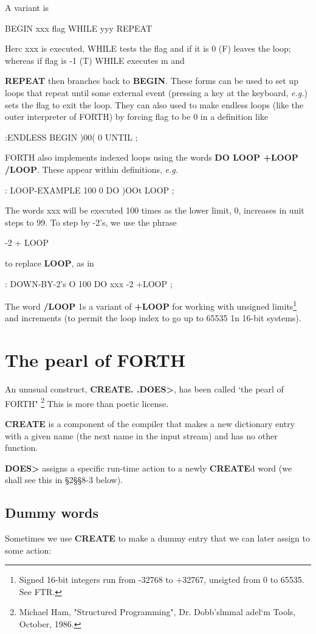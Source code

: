 A variant is

BEGIN xxx ﬂag WHILE yyy REPEAT

Herc xxx is executed, WHILE tests the ﬂag and if it is 0 (F) leaves
the loop; whereas if flag is -1 (T) WHILE executes m and

\textbf{REPEAT} then branches back to \textbf{BEGIN}. These forms can be used to set up loops that repeat until some external event (pressing a key at the keyboard, \textit{\textit{e.g.}}) sets the ﬂag to exit the loop. They can also used to make endless loops (like the outer interpreter of FORTH) by forcing flag to be 0 in a definition like

:ENDLESS BEGIN )00( 0 UNTIL ;

FORTH also implements indexed loops using the words \textbf{DO LOOP +LOOP /LOOP}. These appear within definitions, \textit{\textit{e.g.}}

: LOOP-EXAMPLE 100 0 DO )OOt LOOP ;

The words xxx will be executed 100 times as the lower limit, 0, increases in unit steps to 99. To step by -2's, we use the phrase

-2 + LOOP

to replace \textbf{LOOP}, as in

: DOWN-BY-2's O 100 DO xxx -2 +LOOP ;

The word \textbf{/LOOP} 1s a variant of \textbf{+LOOP} for working with unsigned limits\footnote{Signed 16-bit integers run from -32768 to +32767, unsigted from 0 to 65535. See FTR.} and increments (to permit the loop index to go up to 65535 1n 16-bit systems).

\section{The pearl of FORTH}

An unusual construct, \textbf{CREATE. .DOES>}, has been called ‘the pearl of FORTH" \footnote{Michael Ham, "Structured Programming", Dr. Dobb’slmmal adel‘m Tools, October, 1986.} This is more than poetic license.

\textbf{CREATE} is a component of the compiler that makes a new dictionary entry with a given name (the next name in the input stream) and has no other function.

\textbf{DOES>} assigns a specific run-time action to a newly \textbf{CREATE}d word (we shall see this in §2§§8-3 below).

\subsection{Dummy words}
Sometimes we use \textbf{CREATE} to make a dummy entry that we can later assign to some action:

